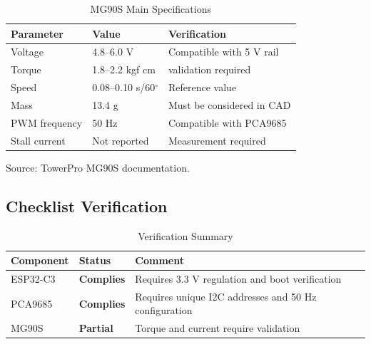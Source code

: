 \documentclass[lettersize,journal]{IEEEtran}
\newcommand{\status}[1]{\textbf{#1}}
\begin{document}
	
	\begin{table}[H]
		\centering
		\caption{MG90S Main Specifications}
		\scriptsize
		
		\setlength{\tabcolsep}{2pt}
		\renewcommand{\arraystretch}{1.05}
		
		\begin{tabularx}{\columnwidth}
			{@{}P{2cm} P{2.2cm} Y@{}}
			
			\toprule
			Parameter & Value & Verification\\
			\midrule
			
			Voltage & 4.8--6.0 V & Compatible with 5 V rail \\
			
			Torque & 1.8--2.2 kgf cm &  validation required \\
			
			Speed & 0.08--0.10 s/60$^\circ$ & Reference value \\
			
			Mass & 13.4 g & Must be considered in CAD \\
			
			PWM frequency & 50 Hz & Compatible with PCA9685 \\
			
			Stall current & Not reported & Measurement required \\
			
			\bottomrule
			
		\end{tabularx}
		
	\end{table}
	
	
	Source: TowerPro MG90S documentation. \cite{mg90s}
	
	\subsection{Checklist Verification}
	
	
	\begin{table}[H]
		\centering
		\caption{Verification Summary}
		\scriptsize
		
		\setlength{\tabcolsep}{2pt}
		\renewcommand{\arraystretch}{1.05}
		
		\begin{tabularx}{\columnwidth}
			{@{}P{2cm} P{1.7cm} Y@{}}
			
			\toprule
			Component &
			Status &
			Comment\\
			\midrule
			
			ESP32-C3 &
			\status{Complies} &
			Requires 3.3 V regulation and boot verification \\
			
			PCA9685 &
			\status{Complies} &
			Requires unique I2C addresses and 50 Hz configuration \\
			
			MG90S &
			\status{Partial} &
			Torque and current require validation \\
			
			\bottomrule
			
		\end{tabularx}
		
	\end{table}
	
\end{document}
